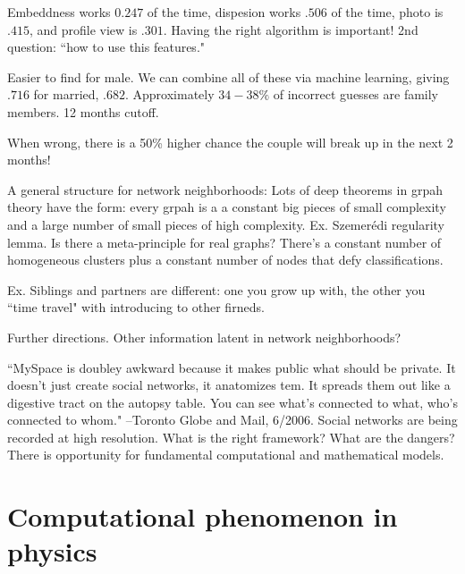 \begin{enumerate}
Embeddness works  $0.247$ of the time, dispesion works $.506$ of the time, photo is $.415$, and profile view is $.301$. Having the right algorithm is important! 2nd question: ``how to use this features."

Easier to find for male.
We can combine all of these via machine learning, giving $.716$ for married, $.682$. Approximately $34-38\%$ of incorrect guesses are family members. 12 months cutoff.

When wrong, there is a 50\% higher chance the couple will break up in the next 2 months! 
\end{enumerate}

A general structure for network neighborhoods: Lots of deep theorems in grpah theory have the form: every grpah is a
a constant big pieces of small complexity and a large number of small pieces of high complexity. Ex. Szemer\'edi regularity lemma. Is there a meta-principle for real graphs? There's a constant number of homogeneous clusters plus a constant number of nodes that defy classifications. 

Ex. Siblings and partners are different: one you grow up with, the other you ``time travel" with introducing to other firneds.

Further directions. Other information latent in network neighborhoods?

``MySpace is doubley awkward because it makes public what should be private. It doesn't just create social networks, it anatomizes tem. It spreads them out like a digestive tract on the autopsy table. You can see what's connected to what, who's connected to whom." --Toronto Globe and Mail, 6/2006. Social networks are being recorded at high resolution. What is the right framework? What are the dangers? There is opportunity for fundamental computational and mathematical models.

\section{Computational phenomenon in physics}

